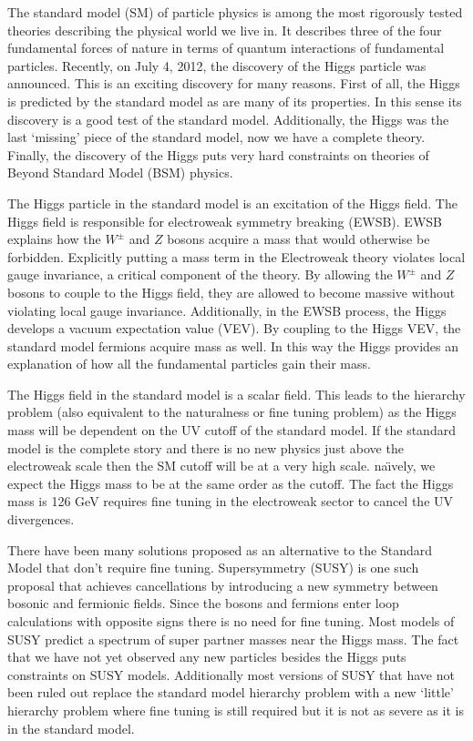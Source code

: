 
The standard model (SM) of particle physics is among the most rigorously tested theories describing the physical world we live in.
It describes three of the four fundamental forces of nature in terms of quantum interactions of fundamental particles.
Recently, on July 4, 2012, the discovery of the Higgs particle was announced.
This is an exciting discovery for many reasons.
First of all, the Higgs is predicted by the standard model as are many of its properties.
In this sense its discovery is a good test of the standard model.
Additionally, the Higgs was the last `missing' piece of the standard model, now we have a complete theory.
Finally, the discovery of the Higgs puts very hard constraints on theories of Beyond Standard Model (BSM) physics.

The Higgs particle in the standard model is an excitation of the Higgs field.
The Higgs field is responsible for electroweak symmetry breaking (EWSB).
EWSB explains how the $W^{\pm}$ and $Z$ bosons acquire a mass that would otherwise be forbidden.
Explicitly putting a mass term in the Electroweak theory violates local gauge invariance, a critical component of the theory.
By allowing the $W^{\pm}$ and $Z$ bosons to couple to the Higgs field, they are allowed to become massive without violating local gauge invariance.
Additionally, in the EWSB process, the Higgs develops a vacuum expectation value (VEV).
By coupling to the Higgs VEV, the standard model fermions acquire mass as well.
In this way the Higgs provides an explanation of how all the fundamental particles gain their mass.

The Higgs field in the standard model is a scalar field.
This leads to the hierarchy problem (also equivalent to the naturalness or fine tuning problem) as the Higgs mass will be dependent on the UV cutoff of the standard model.
If the standard model is the complete story and there is no new physics just above the electroweak scale then the SM cutoff will be at a very high scale.
na\"{\i}vely, we expect the Higgs mass to be at the same order as the cutoff.
The fact the Higgs mass is 126 GeV requires fine tuning in the electroweak sector to cancel the UV divergences.

There have been many solutions proposed as an alternative to the Standard Model that don't require fine tuning.
Supersymmetry (SUSY) is one such proposal that achieves cancellations by introducing a new symmetry between bosonic and fermionic fields.
Since the bosons and fermions enter loop calculations with opposite signs there is no need for fine tuning.
Most models of SUSY predict a spectrum of super partner masses near the Higgs mass.
The fact that we have not yet observed any new particles besides the Higgs puts constraints on SUSY models.
Additionally most versions of SUSY that have not been ruled out replace the standard model hierarchy problem with a new  `little' hierarchy problem where fine tuning is still required but it is not as severe as it is in the standard model.

